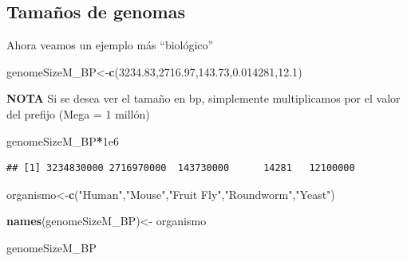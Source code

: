 \documentclass[
]{book}
\newenvironment{Shaded}{\begin{snugshade}}{\end{snugshade}}
\newcommand{\FloatTok}[1]{\textcolor[rgb]{0.00,0.00,0.81}{#1}}
\newcommand{\FunctionTok}[1]{\textcolor[rgb]{0.13,0.29,0.53}{\textbf{#1}}}
\newcommand{\NormalTok}[1]{#1}
\newcommand{\OtherTok}[1]{\textcolor[rgb]{0.56,0.35,0.01}{#1}}
\newcommand{\SpecialCharTok}[1]{\textcolor[rgb]{0.81,0.36,0.00}{\textbf{#1}}}
\newcommand{\StringTok}[1]{\textcolor[rgb]{0.31,0.60,0.02}{#1}}
\begin{document}
\hypertarget{tamauxf1os-de-genomas}{%
\subsection{Tamaños de genomas}\label{tamauxf1os-de-genomas}}

Ahora veamos un ejemplo más ``biológico''

\begin{Shaded}
\begin{Highlighting}[]
\NormalTok{genomeSizeM\_BP}\OtherTok{\textless{}{-}}\FunctionTok{c}\NormalTok{(}\FloatTok{3234.83}\NormalTok{,}\FloatTok{2716.97}\NormalTok{,}\FloatTok{143.73}\NormalTok{,}\FloatTok{0.014281}\NormalTok{,}\FloatTok{12.1}\NormalTok{)}
\end{Highlighting}
\end{Shaded}

\textbf{NOTA} Si se desea ver el tamaño en bp, simplemente multiplicamos por el valor del prefijo (Mega = 1 millón)

\begin{Shaded}
\begin{Highlighting}[]
\NormalTok{genomeSizeM\_BP}\SpecialCharTok{*}\FloatTok{1e6}
\end{Highlighting}
\end{Shaded}

\begin{verbatim}
## [1] 3234830000 2716970000  143730000      14281   12100000
\end{verbatim}

\begin{Shaded}
\begin{Highlighting}[]
\NormalTok{organismo}\OtherTok{\textless{}{-}}\FunctionTok{c}\NormalTok{(}\StringTok{"Human"}\NormalTok{,}\StringTok{"Mouse"}\NormalTok{,}\StringTok{"Fruit Fly"}\NormalTok{,}\StringTok{"Roundworm"}\NormalTok{,}\StringTok{"Yeast"}\NormalTok{)}
\end{Highlighting}
\end{Shaded}

\begin{Shaded}
\begin{Highlighting}[]
\FunctionTok{names}\NormalTok{(genomeSizeM\_BP)}\OtherTok{\textless{}{-}}\NormalTok{ organismo}
\end{Highlighting}
\end{Shaded}

\begin{Shaded}
\begin{Highlighting}[]
\NormalTok{genomeSizeM\_BP}
\end{Highlighting}
\end{Shaded}
\end{document}
